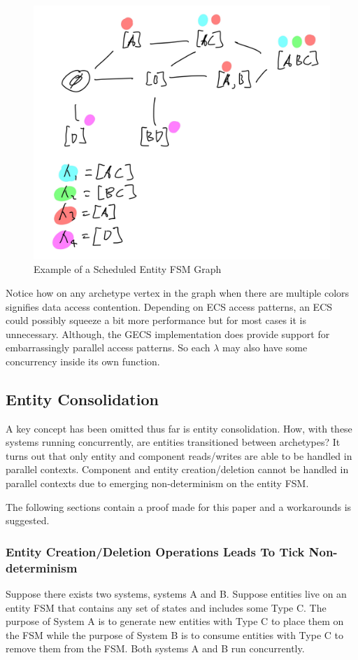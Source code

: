 \begin{figure}[H]
    \centering
    \includegraphics[width=0.8\linewidth]{resources/graph2.png}
    \caption{Example of a Scheduled Entity FSM Graph}
    \label{fig:graph2}
\end{figure}
 
Notice how on any archetype vertex in the graph when there are multiple colors signifies data access contention. Depending on ECS access patterns, an ECS could possibly squeeze a bit more performance but for most cases it is unnecessary. Although, the GECS implementation does provide support for embarrassingly parallel access patterns. So each $\lambda$ may also have some concurrency inside its own function.

\subsection{Entity Consolidation}
A key concept has been omitted thus far is entity consolidation. How, with these systems running concurrently, are entities transitioned between archetypes? It turns out that only entity and component reads/writes are able to be handled in parallel contexts. Component and entity creation/deletion cannot be handled in parallel contexts due to emerging non-determinism on the entity FSM.

The following sections contain a proof made for this paper and a workarounds is suggested.

\subsubsection{Entity Creation/Deletion Operations Leads To Tick Non-determinism}
\label{sec:proof1}
Suppose there exists two systems, systems A and B. Suppose entities live on an entity FSM that contains any set of states and includes some Type C. The purpose of System A is to generate new entities with Type C to place them on the FSM while the purpose of System B is to consume entities with Type C to remove them from the FSM. Both systems A and B run concurrently. 

